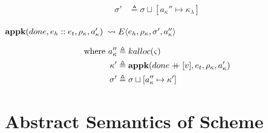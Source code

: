 \documentclass[12pt,draft]{article}
\newcommand\mdoubleplus{\ensuremath{\mathbin{+\mkern-9mu+}}}
\newcommand{\store}[0]{\sigma}
\newcommand{\kaddr}[0]{a_{\kappa}}
\newcommand{\kont}[0]{\kappa}
\newcommand{\state}[0]{\varsigma}
\newcommand{\E}[4]{E\langle #1 , #2 , #3 , #4 \rangle}
\begin{document}
\begin{multicols*}{2}
\begin{align*}
  \store' &\triangleq \store \sqcup [\kaddr'' \mapsto \kont_\lambda]
\end{align*}
\begin{center}
  $\textbf{appk}(done , e_h::e_t , \kenv , \kaddr')$
  $\leadsto \E{e_h}{\kenv}{\store'}{\kaddr''}$
\end{center}
\vspace{-7mm}
\begin{align*}
  \text{where }
  \kaddr'' &\triangleq kalloc(\state) \\
  \kont' &\triangleq \textbf{appk}(done \mdoubleplus [v] , e_t , \kenv , \kaddr') \\
  \store' &\triangleq \store \sqcup [\kaddr'' \mapsto \kont']
\end{align*}
\end{multicols*}


\newcommand{\aenv}[0]{\hat{\rho}}
\newcommand{\astore}[0]{\hat{\sigma}}
\newcommand{\aval}[0]{\hat{v}}
\newcommand{\aclo}[0]{\widehat{clo}}
\newcommand{\abaddr}[0]{\hat{a}}
\newcommand{\akaddr}[0]{\hat{a}_{\hat{\kappa}}}
\newcommand{\aballoc}[1]{\widehat{balloc}(#1)}
\newcommand{\akalloc}[1]{\widehat{kalloc}(#1)}
\newcommand{\akont}[0]{\hat{\kappa}}
\newcommand{\ectrl}[0]{e_{\hat{\varsigma}}}
\newcommand{\adone}[0]{\widehat{done}}
\newcommand{\actrladdr}[0]{\hat{a}_{\kappa\varsigma}}
\newcommand{\actrlkont}[0]{\kappa_{\varsigma}}

\newpage
\section{Abstract Semantics of Scheme}
\end{document}
